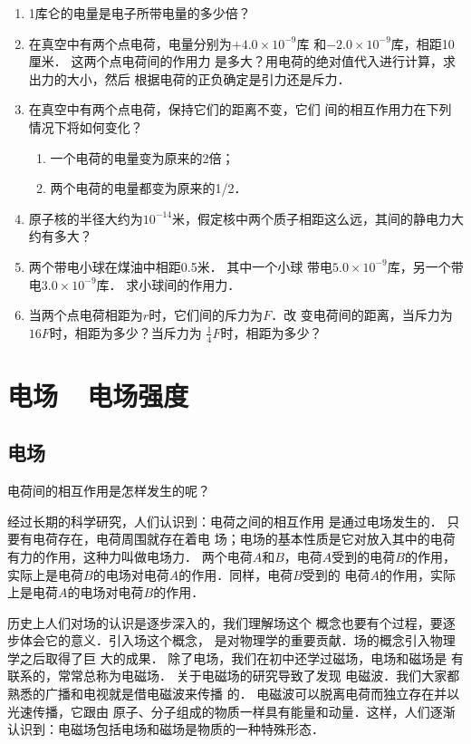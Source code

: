 \begin{enumerate}
    \item 1库仑的电量是电子所带电量的多少倍？
    \item 在真空中有两个点电荷，电量分别为$+4.0\times10^{-9}$库
和$-2.0\times10^{-9}$库，相距10厘米．
这两个点电荷间的作用力
是多大？用电荷的绝对值代入进行计算，求出力的大小，然后
根据电荷的正负确定是引力还是斥力．
\item 在真空中有两个点电荷，保持它们的距离不变，它们
间的相互作用力在下列情况下将如何变化？
\begin{enumerate}
    \item 一个电荷的电量变为原来的2倍；
    \item 两个电荷的电量都变为原来的1/2．
\end{enumerate}
\item 原子核的半径大约为$10^{-14}$米，假定核中两个质子相距这么远，其间的静电力大约有多大？
\item 两个带电小球在煤油中相距0.5米．
其中一个小球
带电$5.0\times10^{-9}$库，另一个带电$3.0\times10^{-9}$库．
求小球间的作用力．
\item 当两个点电荷相距为$r$时，它们间的斥力为$F$．改
变电荷间的距离，当斥力为$16F$时，相距为多少？当斥力为
$\frac{1}{4}F$时，相距为多少？
\end{enumerate}


\section{电场~~电场强度}

\subsection{电场}
电荷间的相互作用是怎样发生的呢？

经过长期的科学研究，人们认识到：电荷之间的相互作用
是通过电场发生的．
只要有电荷存在，电荷周围就存在着电
场；电场的基本性质是它对放入其中的电荷有力的作用，这种力叫做电场力．
两个电荷$A$和$B$，电荷$A$受到的电荷$B$的作用，
实际上是电荷$B$的电场对电荷$A$的作用．同样，电荷$B$受到的
电荷$A$的作用，实际上是电荷$A$的电场对电荷$B$的作用．

历史上人们对场的认识是逐步深入的，我们理解场这个
概念也要有个过程，要逐步体会它的意义．引入场这个概念，
是对物理学的重要贡献．场的概念引入物理学之后取得了巨
大的成果．
除了电场，我们在初中还学过磁场，电场和磁场是
有联系的，常常总称为电磁场．
关于电磁场的研究导致了发现
电磁波．我们大家都熟悉的广播和电视就是借电磁波来传播
的．
电磁波可以脱离电荷而独立存在并以光速传播，它跟由
原子、分子组成的物质一样具有能量和动量．这样，人们逐渐
认识到：电磁场包括电场和磁场是物质的一种特殊形态．

